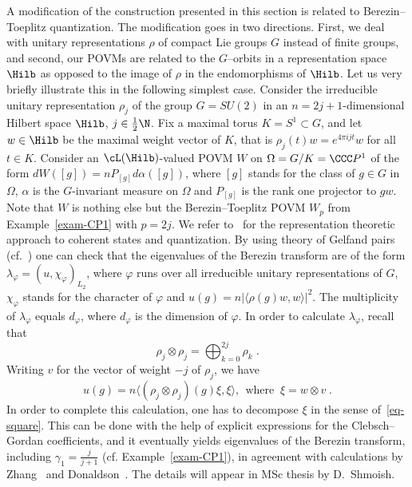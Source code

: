 \begin{rema}\label{rem-rps}
A modification of the construction presented in this section is related to Berezin--Toeplitz quantization. The modification goes in two directions. First, we deal with unitary representations $\rho$ of compact Lie groups $G$ instead of finite groups, and second, our POVMs are related to the $G$--orbits in a representation space $\Hilb$ as opposed to the image of $\rho$ in the endomorphisms of $\Hilb$. Let us very briefly illustrate this in the following simplest case. Consider the irreducible unitary representation $\rho_j$ of the group $G=SU(2)$ in an $n= 2j+1$-dimensional Hilbert space $\Hilb$, $j \in \frac{1}{2}\N$. Fix a maximal torus $K=S^1 \subset G$, and let $w \in \Hilb$ be the maximal weight vector of $K$, that is $\rho_j(t)w= e^{4\pi i j t}w$ for all $t \in K$. Consider an $\cL(\Hilb)$-valued POVM $W$ on $\Omega=G/K=\CCC P^1$ of the form $dW ([g]) = nP_{[g]}d\alpha([g])$, where $[g]$ stands for the class of $g \in G$ in $\Omega$, $\alpha$ is the $G$-invariant measure on $\Omega$ and $P_{[g]}$ is the rank one projector to $gw$. Note that $W$ is nothing else but the Berezin--Toeplitz POVM $W_{p}$ from Example~\ref{exam-CP1} with $p=2j$. We refer to~\cite[Chapter~7]{CR} for the representation theoretic approach to coherent states and quantization. By using theory of Gelfand pairs (cf.~\cite[Chapter~3.F]{Diaconis}) one can check that the eigenvalues of the Berezin transform are of the form $\lambda_\varphi = (u,\chi_\varphi)_{L_2}$, where $\varphi$ runs over all irreducible unitary representations of $G$, $\chi_\varphi$ stands for the character of $\varphi$ and $u(g)=n|\langle \rho(g) w, w\rangle|^2$. The multiplicity of $\lambda_\varphi$ equals $d_\varphi$, where $d_\varphi$ is the dimension of $\varphi$. In order to calculate $\lambda_\varphi$, recall that
\begin{equation}\label{eq-square}
\rho_j \otimes \rho_j = \bigoplus_{k=0}^{2j} \rho_k\;.
\end{equation}
Writing $v$ for the vector of weight $-j$ of $\rho_j$, we have
\[
u(g)=n \big\langle (\rho_j \otimes \rho_j) (g)\xi,\xi\big\rangle,\;\,\text{where}\;\; \xi = w\otimes v\;.
\]
In order to complete this calculation, one has to decompose $\xi$ in the sense of~\eqref{eq-square}. This can be done with the help of explicit expressions for the Clebsch--Gordan coefficients, and it eventually yields eigenvalues of the Berezin transform, including $\gamma_1=\frac{j}{j+1}$ (cf. Example~\ref{exam-CP1}), in agreement with calculations by Zhang~\cite{gap-representations} and Donaldson~\cite[p.~613]{D}. The details will appear in MSc thesis by D.~Shmoish.
\end{rema}


